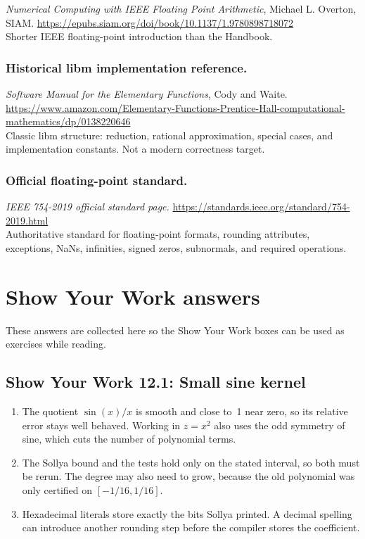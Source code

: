 \documentclass[manuscript, nonacm]{acmart}
\begin{document}
    \emph{Numerical Computing with IEEE Floating Point Arithmetic}, Michael L.
    Overton, SIAM.
    \url{https://epubs.siam.org/doi/book/10.1137/1.9780898718072}\\
    Shorter IEEE floating-point introduction than the Handbook.

    \subsubsection{Historical libm implementation reference.}

    \emph{Software Manual for the Elementary Functions}, Cody and Waite.
    \url{https://www.amazon.com/Elementary-Functions-Prentice-Hall-computational-mathematics/dp/0138220646}\\
    Classic libm structure: reduction, rational approximation, special cases, and
    implementation constants. Not a modern correctness target.

    \subsubsection{Official floating-point standard.}

    \emph{IEEE 754-2019 official standard page.}
    \url{https://standards.ieee.org/standard/754-2019.html}\\
    Authoritative standard for floating-point formats, rounding attributes,
    exceptions, NaNs, infinities, signed zeros, subnormals, and required
    operations.

    \appendix


    \section{Show Your Work answers}

    These answers are collected here so the Show Your Work boxes can be used as
    exercises while reading.

    \subsection*{Show Your Work 12.1: Small sine kernel}

    \begin{enumerate}
        \item The quotient $\sin(x)/x$ is smooth and close to~1 near zero, so its
        relative error stays well behaved. Working in $z = x^2$ also uses the odd
        symmetry of sine, which cuts the number of polynomial terms.
        \item The Sollya bound and the tests hold only on the stated interval, so
        both must be rerun. The degree may also need to grow, because the old
        polynomial was only certified on $[-1/16, 1/16]$.
        \item Hexadecimal literals store exactly the bits Sollya printed. A
        decimal spelling can introduce another rounding step before the compiler
        stores the coefficient.
    \end{enumerate}
\end{document}
